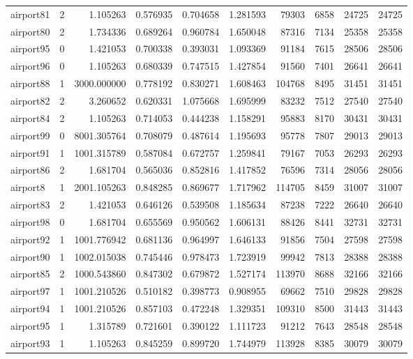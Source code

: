 \begin{longtable}{|l|r|r|r|r|r|r|r|r|r|}
airport81 & 2 & 1.105263 & 0.576935 & 0.704658 & 1.281593 & 79303 & 6858 & 24725 & 24725 \\
airport80 & 2 & 1.734336 & 0.689264 & 0.960784 & 1.650048 & 87316 & 7134 & 25358 & 25358 \\
airport95 & 0 & 1.421053 & 0.700338 & 0.393031 & 1.093369 & 91184 & 7615 & 28506 & 28506 \\
airport96 & 0 & 1.105263 & 0.680339 & 0.747515 & 1.427854 & 91560 & 7401 & 26641 & 26641 \\
airport88 & 1 & 3000.000000 & 0.778192 & 0.830271 & 1.608463 & 104768 & 8495 & 31451 & 31451 \\
airport82 & 2 & 3.260652 & 0.620331 & 1.075668 & 1.695999 & 83232 & 7512 & 27540 & 27540 \\
airport84 & 2 & 1.105263 & 0.714053 & 0.444238 & 1.158291 & 95883 & 8170 & 30431 & 30431 \\
airport99 & 0 & 8001.305764 & 0.708079 & 0.487614 & 1.195693 & 95778 & 7807 & 29013 & 29013 \\
airport91 & 1 & 1001.315789 & 0.587084 & 0.672757 & 1.259841 & 79167 & 7053 & 26293 & 26293 \\
airport86 & 2 & 1.681704 & 0.565036 & 0.852816 & 1.417852 & 76596 & 7314 & 28056 & 28056 \\
airport8 & 1 & 2001.105263 & 0.848285 & 0.869677 & 1.717962 & 114705 & 8459 & 31007 & 31007 \\
airport83 & 2 & 1.421053 & 0.646126 & 0.539508 & 1.185634 & 87238 & 7222 & 26640 & 26640 \\
airport98 & 0 & 1.681704 & 0.655569 & 0.950562 & 1.606131 & 88426 & 8441 & 32731 & 32731 \\
airport92 & 1 & 1001.776942 & 0.681136 & 0.964997 & 1.646133 & 91856 & 7504 & 27598 & 27598 \\
airport90 & 1 & 1002.015038 & 0.745446 & 0.978473 & 1.723919 & 99942 & 7813 & 28388 & 28388 \\
airport85 & 2 & 1000.543860 & 0.847302 & 0.679872 & 1.527174 & 113970 & 8688 & 32166 & 32166 \\
airport97 & 1 & 1001.210526 & 0.510182 & 0.398773 & 0.908955 & 69662 & 7510 & 29828 & 29828 \\
airport94 & 1 & 1001.210526 & 0.857103 & 0.472248 & 1.329351 & 109310 & 8500 & 31443 & 31443 \\
airport95 & 1 & 1.315789 & 0.721601 & 0.390122 & 1.111723 & 91212 & 7643 & 28548 & 28548 \\
airport93 & 1 & 1.105263 & 0.845259 & 0.899720 & 1.744979 & 113928 & 8385 & 30079 & 30079 \\

\end{longtable}
